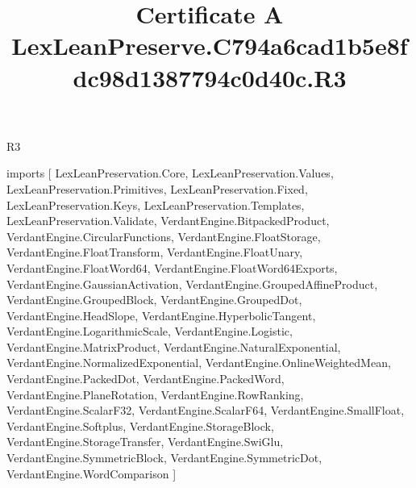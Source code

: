 \begin{lexlean}{R3}
\title{Certificate A LexLeanPreserve.C794a6cad1b5e8fdc98d1387794c0d40c.R3}
\begin{coremodule}
imports [
  LexLeanPreservation.Core,
  LexLeanPreservation.Values,
  LexLeanPreservation.Primitives,
  LexLeanPreservation.Fixed,
  LexLeanPreservation.Keys,
  LexLeanPreservation.Templates,
  LexLeanPreservation.Validate,
  VerdantEngine.BitpackedProduct,
  VerdantEngine.CircularFunctions,
  VerdantEngine.FloatStorage,
  VerdantEngine.FloatTransform,
  VerdantEngine.FloatUnary,
  VerdantEngine.FloatWord64,
  VerdantEngine.FloatWord64Exports,
  VerdantEngine.GaussianActivation,
  VerdantEngine.GroupedAffineProduct,
  VerdantEngine.GroupedBlock,
  VerdantEngine.GroupedDot,
  VerdantEngine.HeadSlope,
  VerdantEngine.HyperbolicTangent,
  VerdantEngine.LogarithmicScale,
  VerdantEngine.Logistic,
  VerdantEngine.MatrixProduct,
  VerdantEngine.NaturalExponential,
  VerdantEngine.NormalizedExponential,
  VerdantEngine.OnlineWeightedMean,
  VerdantEngine.PackedDot,
  VerdantEngine.PackedWord,
  VerdantEngine.PlaneRotation,
  VerdantEngine.RowRanking,
  VerdantEngine.ScalarF32,
  VerdantEngine.ScalarF64,
  VerdantEngine.SmallFloat,
  VerdantEngine.Softplus,
  VerdantEngine.StorageBlock,
  VerdantEngine.StorageTransfer,
  VerdantEngine.SwiGlu,
  VerdantEngine.SymmetricBlock,
  VerdantEngine.SymmetricDot,
  VerdantEngine.WordComparison
]


\end{coremodule}
\end{lexlean}

